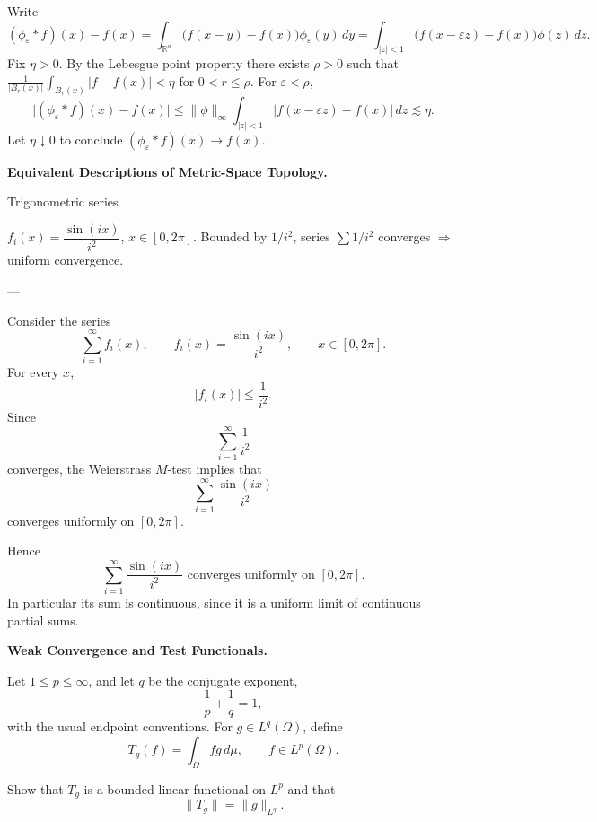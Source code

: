\begin{solution}
Write
\[
(\phi_\varepsilon*f)(x)-f(x)
=\int_{\mathbb{R}^n}\!\bigl(f(x-y)-f(x)\bigr)\phi_\varepsilon(y)\,dy
=\int_{|z|<1}\!\bigl(f(x-\varepsilon z)-f(x)\bigr)\phi(z)\,dz.
\]
Fix $\eta>0$. By the Lebesgue point property there exists $\rho>0$ such that
$\frac{1}{|B_r(x)|}\int_{B_r(x)} |f-f(x)|<\eta$ for $0<r\le\rho$. For $\varepsilon<\rho$,
\[
\big|(\phi_\varepsilon*f)(x)-f(x)\big|
\le \|\phi\|_\infty \int_{|z|<1}\!|f(x-\varepsilon z)-f(x)|\,dz
\lesssim \eta.
\]
Let $\eta\downarrow0$ to conclude $(\phi_\varepsilon*f)(x)\to f(x)$.
\end{solution}

\begin{problem}[CP-II-0074]
\label{prob:cp-ii-0074}
\textbf{Equivalent Descriptions of Metric-Space Topology.}

\hspace*{1.5em}Trigonometric series

$f_i(x)=\dfrac{\sin(ix)}{i^2}$, $x\in[0,2\pi]$.
Bounded by $1/i^2$, series $\sum 1/i^2$ converges $\Rightarrow$ uniform convergence.

---
\end{problem}

\begin{solution}
Consider the series
\[
\sum_{i=1}^{\infty}
f_i(x),
\qquad
f_i(x)=\frac{\sin(ix)}{i^2},
\qquad
x\in[0,2\pi].
\]
For every \(x\),
\[
|f_i(x)|
\le
\frac1{i^2}.
\]
Since
\[
\sum_{i=1}^{\infty}\frac1{i^2}
\]
converges, the Weierstrass \(M\)-test implies that
\[
\sum_{i=1}^{\infty}
\frac{\sin(ix)}{i^2}
\]
converges uniformly on \([0,2\pi]\).

Hence
\[
\boxed{
\sum_{i=1}^{\infty}\frac{\sin(ix)}{i^2}
\text{ converges uniformly on }[0,2\pi].
}
\]
In particular its sum is continuous, since it is a uniform limit of continuous partial sums.
\end{solution}


\begin{problem}[CP-II-0078]
\label{prob:cp-ii-0078}
\textbf{Weak Convergence and Test Functionals.}

\hspace*{1.5em}Let \(1\le p\le\infty\), and let \(q\) be the conjugate exponent,
\[
\frac1p+\frac1q=1,
\]
with the usual endpoint conventions. For \(g\in L^q(\Omega)\), define
\[
T_g(f)=\int_\Omega f g\,d\mu,
\qquad f\in L^p(\Omega).
\]

Show that \(T_g\) is a bounded linear functional on \(L^p\) and that
\[
\|T_g\|=\|g\|_{L^q}.
\]
\end{problem}

